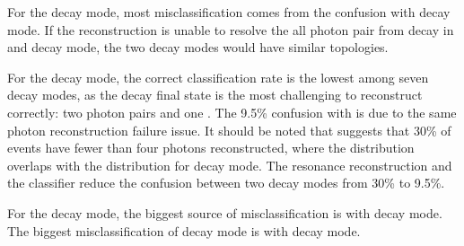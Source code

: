 

For the \decayRhoShortest decay mode, most misclassification comes from the confusion with \decayAiPhotonShortest decay mode.  If the reconstruction is unable to resolve the all photon pair from \Ppizero decay in \decayRhoShortest and \decayAiPhotonShortest decay mode, the two decay modes would have similar topologies.

For the \decayAiPhotonShortest decay mode, the correct classification rate is the lowest among seven decay modes, as the \decayAiPhotonShortest decay final state is the most challenging to reconstruct correctly: two photon pairs and  one \Ppipm. The 9.5\% confusion with \decayRhoShortest is due to the same photon reconstruction failure issue. It should be noted that  suggests that 30\% of \decayAiPhotonShortest events have fewer than four photons reconstructed, where the distribution overlaps with the distribution for \decayRhoShortest decay mode. The \decayAiPhotonShortest resonance reconstruction and the \multiclass classifier reduce the confusion between two decay modes from 30\% to  9.5\%.

For the \decayAiPionShortest decay mode, the biggest source of misclassification is with \decayThreePionPhotonShort decay mode. The biggest misclassification of  \decayThreePionPhotonShort decay mode  is with \decayAiPionShortest decay mode.




